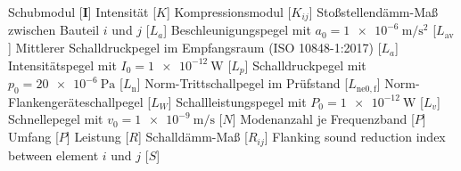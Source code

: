 \begin{acronym}[-------------------]
{		%
		Schubmodul
	} %
		[$\mathbf{I}$]		{\acrounit{\watt\per\m\squared}
		Intensität
	} %
		[$ K $]				{\acrounit{\pascal}
		Kompressionsmodul
	} %
		[$ K_{ij} $]		{\acrounit{\dB}
		Stoßstellendämm-Maß zwischen Bauteil 
		$i$ und $j$
	}
	 	[$L_a$] 			{\acrounit{\dB}
		Beschleunigungspegel mit
		$a_0=\SI{1e-6}{\m\per\s\squared}$
	} 		
	 	[$L_\mathrm{av}$]				{\acrounit{\decibel}
		Mittlerer Schalldruckpegel im Empfangsraum (ISO 10848-1:2017)
	} %
	 	[$L_a$] 			{\acrounit{\dB}
		Intensitätspegel mit
		$I_0=\SI{1e-12}{\watt}$
	} 		
	 	[$L_p$] 			{\acrounit{\dB}
		Schalldruckpegel mit	
		$p_0=\SI{20e-6}{\pascal}$
	} %
		[$L_{\mathrm{n}}$]	{\acrounit{\decibel}
		Norm-Trittschallpegel im Prüfstand
	}
		[$L_{\mathrm{ne0,f}}$]	{\acrounit{\decibel}
		Norm-Flankengeräteschallpegel
	} %
	 	[$L_W$] 			{\acrounit{\dB}
		Schallleistungspegel mit
		$P_0=\SI{1e-12}{\watt}$
	} %
	 	[$L_v$] 			{\acrounit{\dB}
		Schnellepegel mit
		$v_0=\SI{1e-9}{\m\per\s}$
	}
		[$N$]				{\acrounit{-}
		Modenanzahl je Frequenzband
	}
		[$P$]				{\acrounit{\m}
		Umfang
	} %
	    [$P$] 				{\acrounit{\watt}
		Leistung
	} %
		[$R$]				{\acrounit{\dB}
		Schalldämm-Maß
	}%
		[$ R_{ij} $]		{\acrounit{\dB}
		Flanking sound reduction index between element   
		$i$ und $j$
	}
		[$S$]				{\acrounit{\m\squared}
}
\end{acronym}
